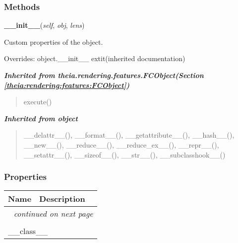 
  \subsubsection{Methods}

    \vspace{0.5ex}

\hspace{.8\funcindent}\begin{boxedminipage}{\funcwidth}

    \raggedright \textbf{\_\_init\_\_}(\textit{self}, \textit{obj}, \textit{lens})

\setlength{\parskip}{2ex}
    Custom properties of the object.

\setlength{\parskip}{1ex}
      Overrides: object.\_\_init\_\_ 	extit{(inherited documentation)}

    \end{boxedminipage}


\large{\textbf{\textit{Inherited from theia.rendering.features.FCObject\textit{(Section \ref{theia:rendering:features:FCObject})}}}}

\begin{quote}
execute()
\end{quote}

\large{\textbf{\textit{Inherited from object}}}

\begin{quote}
\_\_delattr\_\_(), \_\_format\_\_(), \_\_getattribute\_\_(), \_\_hash\_\_(), \_\_new\_\_(), \_\_reduce\_\_(), \_\_reduce\_ex\_\_(), \_\_repr\_\_(), \_\_setattr\_\_(), \_\_sizeof\_\_(), \_\_str\_\_(), \_\_subclasshook\_\_()
\end{quote}


  \subsubsection{Properties}

    \vspace{-1cm}
\hspace{\varindent}\begin{longtable}{|p{\varnamewidth}|p{\vardescrwidth}|l}
\cline{1-2}
\cline{1-2} \centering \textbf{Name} & \centering \textbf{Description}& \\
\cline{1-2}
\endhead\cline{1-2}\multicolumn{3}{r}{\small\textit{continued on next page}}\\\endfoot\cline{1-2}
\endlastfoot\multicolumn{2}{|l|}{\textit{Inherited from object}}\\
\multicolumn{2}{|p{\varwidth}|}{\raggedright \_\_class\_\_}\\
\cline{1-2}
\end{longtable}



